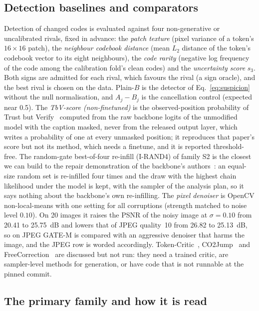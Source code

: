 \subsection{Detection baselines and comparators}\label{ssec:baselines}
Detection of changed codes is evaluated against four non-generative or uncalibrated rivals, fixed in advance:
the \emph{patch texture} (pixel variance of a token's $16\times16$ patch), the \emph{neighbour codebook distance}
(mean $L_2$ distance of the token's codebook vector to its eight neighbours), the \emph{code rarity} (negative log frequency of the
code among the calibration fold's clean codes) and the \emph{uncertainty score} $s_3$.
Both signs are admitted for each rival, which favours the rival (a sign oracle), and the best rival is chosen on the data.
Plain-$B$ is the detector of Eq.~\eqref{eq:suspicion} without the null normalisation, and $A_j-B_j$ is the cancellation control
(expected near 0.5).
The \emph{TbV-score (non-finetuned)} is the observed-position probability of Trust but Verify~\citep{jhingran2026trustverify}
computed from the raw backbone logits of the unmodified model with the caption masked, never from the released output layer, which
writes a probability of one at every unmasked position; it reproduces that paper's score but not its method, which needs a finetune,
and it is reported threshold-free.
The random-gate best-of-four re-infill (I-RAND4) of family S2 is the closest we can build to the repair demonstration of the
backbone's authors~\citep{swerdlow2025unidisc}: an equal-size random set is re-infilled four times and the draw with the highest chain
likelihood under the model is kept, with the sampler of the analysis plan, so it says nothing about the backbone's own re-infilling.
The \emph{pixel denoiser} is OpenCV non-local-means with one setting for all corruptions (strength matched to noise level $0.10$).
On 20 images it raises the PSNR of the noisy image at $\sigma=0.10$ from 20.41 to 25.75~dB and lowers that of JPEG quality~10 from
26.82 to 25.13~dB, so on JPEG GATE-M is compared with an aggressive denoiser that harms the image, and the JPEG row is worded
accordingly.
Token-Critic~\citep{lezama2022tokencritic}, CO2Jump~\citep{le2026co2jump} and FreeCorrection~\citep{ouyang2026freecorrection} are
discussed but not run: they need a trained critic, are sampler-level methods for generation, or have code that is not
runnable at the pinned commit.

\subsection{The primary family and how it is read}\label{ssec:tests}
